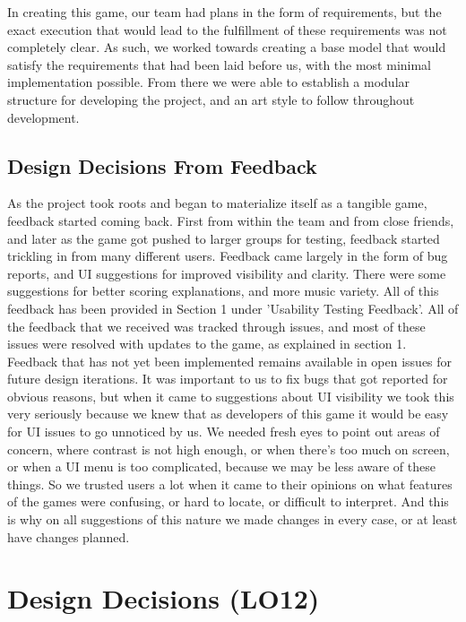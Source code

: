 \documentclass{article}
\begin{document}
In creating this game, our team had plans in the form of requirements, but the exact execution that would lead to the fulfillment of these requirements was not completely clear. As such, we worked towards creating a base model that would satisfy the requirements that had been laid before us, with the most minimal implementation possible. From there we were able to establish a modular structure for developing the project, and an art style to follow throughout development.

\subsection{Design Decisions From Feedback}

As the project took roots and began to materialize itself as a tangible game, feedback started coming back. First from within the team and from close friends, and later as the game got pushed to larger groups for testing, feedback started trickling in from many different users. Feedback came largely in the form of bug reports, and UI suggestions for improved visibility and clarity. There were some suggestions for better scoring explanations, and more music variety. All of this feedback has been provided in Section 1 under 'Usability Testing Feedback'. All of the feedback that we received was tracked through issues, and most of these issues were resolved with updates to the game, as explained in section 1. Feedback that has not yet been implemented remains available in open issues for future design iterations. It was important to us to fix bugs that got reported for obvious reasons, but when it came to suggestions about UI visibility we took this very seriously because we knew that as developers of this game it would be easy for UI issues to go unnoticed by us. We needed fresh eyes to point out areas of concern, where contrast is not high enough, or when there's too much on screen, or when a UI menu is too complicated, because we may be less aware of these things. So we trusted users a lot when it came to their opinions on what features of the games were confusing, or hard to locate, or difficult to interpret. And this is why on all suggestions of this nature we made changes in every case, or at least have changes planned.

\section{Design Decisions (LO12)}

\end{document}
